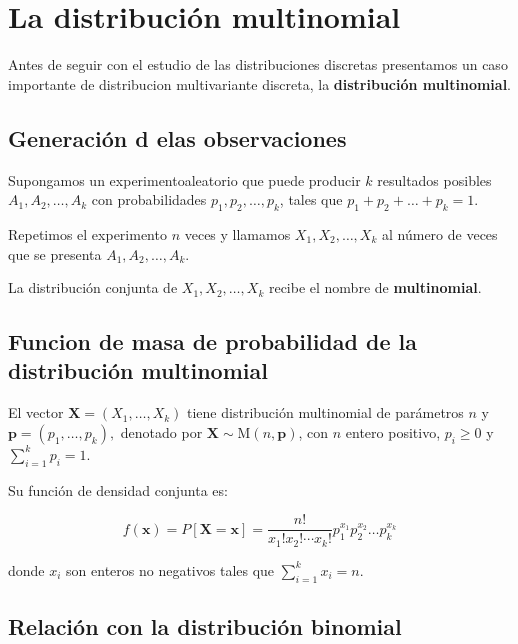 \documentclass[
  a4paper,
  DIV=11,
  numbers=noendperiod]{scrreprt}
\begin{document}
\section{La distribución
multinomial}\label{la-distribuciuxf3n-multinomial}

Antes de seguir con el estudio de las distribuciones discretas
presentamos un caso importante de distribucion multivariante discreta,
la \textbf{distribución multinomial}.

\subsection{Generación d elas
observaciones}\label{generaciuxf3n-d-elas-observaciones}

Supongamos un experimentoaleatorio que puede producir \(k\) resultados
posibles \(A_1, A_2, \dots, A_k\) con probabilidades
\(p_1, p_2, \dots, p_k\), tales que \(p_1 + p_2 + \dots + p_k = 1\).

Repetimos el experimento \(n\) veces y llamamos \(X_1, X_2, \dots, X_k\)
al número de veces que se presenta \(A_1, A_2, \dots, A_k\).

La distribución conjunta de \(X_1, X_2, \dots, X_k\) recibe el nombre de
\textbf{multinomial}.

\subsection{Funcion de masa de probabilidad de la distribución
multinomial}\label{funcion-de-masa-de-probabilidad-de-la-distribuciuxf3n-multinomial}

El vector \(\mathbf{X} = (X_1, \dots, X_k)\) tiene distribución
multinomial de parámetros \(n\) y \(\mathbf{p} = (p_1, \dots, p_k),\)
denotado por \(\mathbf{X} \sim \mathrm{M}(n, \mathbf{p})\), con \(n\)
entero positivo, \(p_i \geq 0\) y \(\sum_{i=1}^{k} p_i = 1\).

Su función de densidad conjunta es:

\[
f(\mathbf{x}) = P[\mathbf{X} = \mathbf{x}] = \frac{n!}{x_1!x_2!\cdots x_k!} p_1^{x_1} p_2^{x_2} \dots p_k^{x_k}
\]

donde \(x_i\) son enteros no negativos tales que
\(\sum_{i=1}^{k} x_i = n\).

\subsection{Relación con la distribución
binomial}\label{relaciuxf3n-con-la-distribuciuxf3n-binomial}
\end{document}
